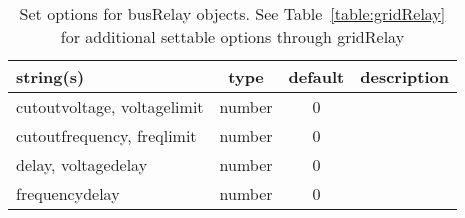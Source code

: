 \begin{table}[ht]
\centering
\begin{tabular}{p{5cm} c c p{7cm}}
\hline
string(s) & type & default & description \\
\hline
cutoutvoltage, voltagelimit & number & 0 & \\
cutoutfrequency, freqlimit & number & 0 & \\
delay, voltagedelay & number & 0 & \\
frequencydelay & number & 0 & \\
\hline
\end{tabular}
\caption{Set options for busRelay objects. See Table~\ref{table:gridRelay} for additional settable options through gridRelay}
\label{table:busRelay}
\end{table}
